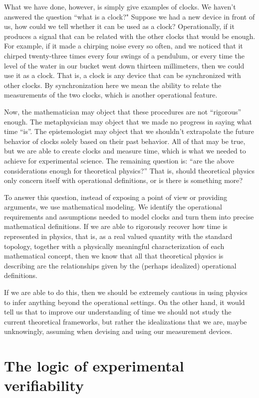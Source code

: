 \documentclass[10pt,twocolumn, nofootinbib]{revtex4-2}
\begin{document}
What we have done, however, is simply give examples of clocks. We haven't answered the question ``what is a clock?" Suppose we had a new device in front of us, how could we tell whether it can be used as a clock? Operationally, if it produces a signal that can be related with the other clocks that would be enough. For example, if it made a chirping noise every so often, and we noticed that it chirped twenty-three times every four swings of a pendulum, or every time the level of the water in our bucket went down thirteen millimeters, then we could use it as a clock. That is, a clock is any device that can be synchronized with other clocks. By synchronization here we mean the ability to relate the measurements of the two clocks, which is another operational feature.

Now, the mathematician may object that these procedures are not ``rigorous'' enough. The metaphysician may object that we made no progress in saying what time ``is''. The epistemologist may object that we shouldn't extrapolate the future behavior of clocks solely based on their past behavior. All of that may be true, but we are able to create clocks and measure time, which is what we needed to achieve for experimental science. The remaining question is: ``are the above considerations enough for theoretical physics?'' That is, should theoretical physics only concern itself with operational definitions, or is there is something more?

To answer this question, instead of exposing a point of view or providing arguments, we use mathematical modeling. We identify the operational requirements and assumptions needed to model clocks and turn them into precise mathematical definitions. If we are able to rigorously recover how time is represented in physics, that is, as a real valued quantity with the standard topology, together with a physically meaningful characterization of each mathematical concept, then we know that all that theoretical physics is describing are the relationships given by the (perhaps idealized) operational definitions.

If we are able to do this, then we should be extremely cautious in using physics to infer anything beyond the operational settings. On the other hand, it would tell us that to improve our understanding of time we should not study the current theoretical frameworks, but rather the idealizations that we are, maybe unknowingly, assuming when devising and using our measurement devices.

\section{The logic of experimental verifiability}
\end{document}
